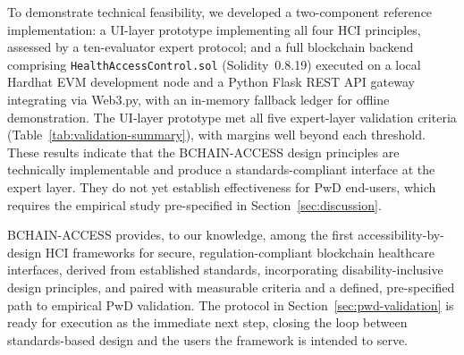 \documentclass[journal,onecolumn]{IEEEtran}
\begin{document}
To demonstrate technical feasibility, we developed a two-component reference implementation: a UI-layer prototype implementing all four HCI principles, assessed by a ten-evaluator expert protocol; and a full blockchain backend comprising \texttt{HealthAccessControl.sol} (Solidity~0.8.19) executed on a local Hardhat EVM development node and a Python Flask REST API gateway integrating via Web3.py, with an in-memory fallback ledger for offline demonstration. The UI-layer prototype met all five expert-layer validation criteria (Table~\ref{tab:validation-summary}), with margins well beyond each threshold. These results indicate that the BCHAIN-ACCESS design principles are technically implementable and produce a standards-compliant interface at the expert layer. They do not yet establish effectiveness for PwD end-users, which requires the empirical study pre-specified in Section~\ref{sec:discussion}.

BCHAIN-ACCESS provides, to our knowledge, among the first accessibility-by-design HCI frameworks for secure, regulation-compliant blockchain healthcare interfaces, derived from established standards, incorporating disability-inclusive design principles, and paired with measurable criteria and a defined, pre-specified path to empirical PwD validation. The protocol in Section~\ref{sec:pwd-validation} is ready for execution as the immediate next step, closing the loop between standards-based design and the users the framework is intended to serve.



\end{document}
